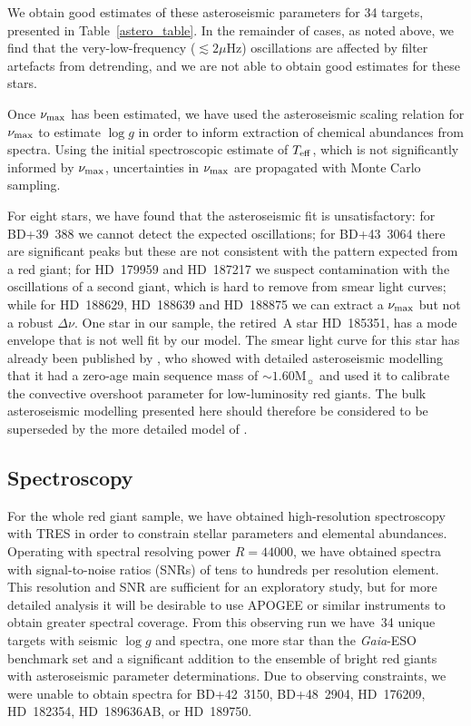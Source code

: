 \documentclass[a4paper,fleqn,usenatbib]{mnras}
\newcommand{\numax}{\mbox{$\nu_{\rm max}$}\xspace}
\newcommand{\Dnu}{\mbox{$\Delta \nu$}\xspace}
\newcommand{\muHz}{\mbox{$\mu$Hz}\xspace}
\newcommand{\teff}{\mbox{$T_{\rm eff}$}\xspace}
\newcommand{\logg}{\mbox{$\log g$}\xspace}
\newcommand{\msun}{\mbox{$\mathrm{M}_{\sun}$}\xspace}
\newcommand{\gaia}{\emph{Gaia}\xspace}
\begin{document}
We obtain good estimates of these asteroseismic parameters for 34 targets, presented in Table~\ref{astero_table}. In the remainder of cases, as noted above, we find that the very-low-frequency ($\lesssim 2\muHz$) oscillations are affected by filter artefacts from detrending, and we are not able to obtain good estimates for these stars. 

Once \numax has been estimated, we have used the asteroseismic scaling relation for \numax \citep[Equation~\ref{scaling};][]{KB95} to estimate \logg in order to inform extraction of chemical abundances from spectra. Using the initial spectroscopic estimate of \teff, which is not significantly informed by \numax, uncertainties in \numax are propagated with Monte Carlo sampling. 

For eight stars, we have found that the asteroseismic fit is unsatisfactory: for BD+39~388 we cannot detect the expected oscillations; for BD+43~3064 there are significant peaks but these are not consistent with the pattern expected from a red giant; for HD~179959 and HD~187217 we suspect contamination with the oscillations of a second giant, which is hard to remove from smear light curves; while for HD~188629, HD~188639 and HD~188875 we can extract a \numax but not a robust \Dnu. One star in our sample, the retired~A star HD~185351, has a mode envelope that is not well fit by our model. The smear light curve for this star has already been published by \citet{2017MNRAS.464.3713H}, who showed with detailed asteroseismic modelling that it had a zero-age main sequence mass of $\sim 1.60 \msun$ and used it to calibrate the convective overshoot parameter for low-luminosity red giants. The bulk asteroseismic modelling presented here should therefore be considered to be superseded by the more detailed model of \citet{2017MNRAS.464.3713H}. 



\subsection{Spectroscopy}
\label{spectroscopy}

For the whole red giant sample, we have obtained high-resolution spectroscopy with TRES in order to constrain stellar parameters and elemental abundances. Operating with spectral resolving power $R=44 000$, we have obtained spectra with signal-to-noise ratios (SNRs) of tens to hundreds per resolution element. This resolution and SNR are sufficient for an exploratory study, but for more detailed analysis it will be desirable to use APOGEE or similar instruments to obtain greater spectral coverage. From this observing run we have~34 unique targets with seismic \logg and spectra, one more star than the \gaia-ESO benchmark set and a significant addition to the ensemble of bright red giants with asteroseismic parameter determinations. Due to observing constraints, we were unable to obtain spectra for BD+42~3150, BD+48~2904, HD~176209, HD~182354, HD~189636AB, or HD~189750. %
\end{document}
